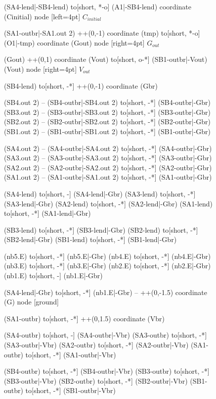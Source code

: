 \documentclass[a4paper, 10pt]{article}
\begin{document}
\begin{figure}[!h]
{\begin{circuitikz}[american, rotate=-90, transform shape]
			(SA4-lend|-SB4-lend)
			to[short, *-o] (A1|-SB4-lend)
			coordinate (Cinitial)
			node [left=4pt] {$C_{initial}$}


			(SA1-outbr|-SA1.out 2) ++(0,-1)
			coordinate (tmp)
			to[short, *-o] (O1|-tmp)
			coordinate (Gout)
			node [right=4pt] {$G_{out}$}

			(Gout) ++(0,1)
			coordinate (Vout)
			to[short, o-*] (SB1-outbr|-Vout)
			(Vout)
			node [right=4pt] {$V_{out}$}


			(SB4-lend) to[short, -*] ++(0,-1)
			coordinate (Gbr)

			(SB4.out 2) -- (SB4-outbr|-SB4.out 2)
			to[short, -*] (SB4-outbr|-Gbr)
			(SB3.out 2) -- (SB3-outbr|-SB3.out 2)
			to[short, -*] (SB3-outbr|-Gbr)
			(SB2.out 2) -- (SB2-outbr|-SB2.out 2)
			to[short, -*] (SB2-outbr|-Gbr)
			(SB1.out 2) -- (SB1-outbr|-SB1.out 2)
			to[short, -*] (SB1-outbr|-Gbr)

			(SA4.out 2) -- (SA4-outbr|-SA4.out 2)
			to[short, -*] (SA4-outbr|-Gbr)
			(SA3.out 2) -- (SA3-outbr|-SA3.out 2)
			to[short, -*] (SA3-outbr|-Gbr)
			(SA2.out 2) -- (SA2-outbr|-SA2.out 2)
			to[short, -*] (SA2-outbr|-Gbr)
			(SA1.out 2) -- (SA1-outbr|-SA1.out 2)
			to[short, -*] (SA1-outbr|-Gbr)

			(SA4-lend) to[short, -] (SA4-lend|-Gbr)
			(SA3-lend) to[short, -*] (SA3-lend|-Gbr)
			(SA2-lend) to[short, -*] (SA2-lend|-Gbr)
			(SA1-lend) to[short, -*] (SA1-lend|-Gbr)

			(SB3-lend) to[short, -*] (SB3-lend|-Gbr)
			(SB2-lend) to[short, -*] (SB2-lend|-Gbr)
			(SB1-lend) to[short, -*] (SB1-lend|-Gbr)

			(nb5.E) to[short, -*] (nb5.E|-Gbr)
			(nb4.E) to[short, -*] (nb4.E|-Gbr)
			(nb3.E) to[short, -*] (nb3.E|-Gbr)
			(nb2.E) to[short, -*] (nb2.E|-Gbr)
			(nb1.E) to[short, -] (nb1.E|-Gbr)

			(SA4-lend|-Gbr)
			to[short, -*] (nb1.E|-Gbr)
			-- ++(0,-1.5)
			coordinate (G)
			node [ground] {}


			(SA1-outbr) to[short, -*] ++(0,1.5)
			coordinate (Vbr)

			(SA4-outbr) to[short, -] (SA4-outbr|-Vbr)
			(SA3-outbr) to[short, -*] (SA3-outbr|-Vbr)
			(SA2-outbr) to[short, -*] (SA2-outbr|-Vbr)
			(SA1-outbr) to[short, -*] (SA1-outbr|-Vbr)

			(SB4-outbr) to[short, -*] (SB4-outbr|-Vbr)
			(SB3-outbr) to[short, -*] (SB3-outbr|-Vbr)
			(SB2-outbr) to[short, -*] (SB2-outbr|-Vbr)
			(SB1-outbr) to[short, -*] (SB1-outbr|-Vbr)



\end{circuitikz}}
\end{figure}
\end{document}
